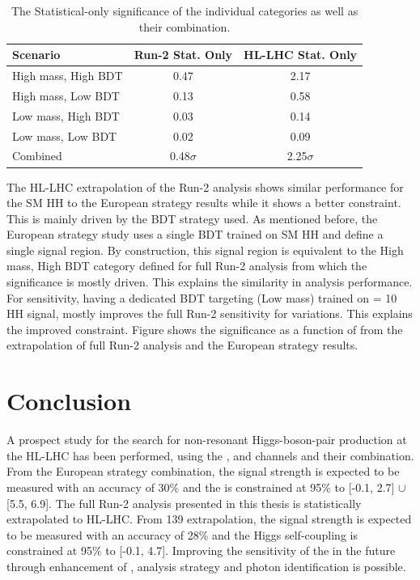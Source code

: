 \begin{table}[htbp]
    \centering
    \begin{tabular}{lcc}
    \hline\hline 
        Scenario & Run-2 Stat. Only & HL-LHC Stat. Only \\
    \hline    
        High mass, High BDT & 0.47 & 2.17 \\
        High mass, Low BDT  & 0.13 & 0.58 \\
        Low mass, High BDT  & 0.03 & 0.14 \\
        Low mass, Low BDT   & 0.02 & 0.09 \\
        \hline
        Combined & 0.48$\sigma$ & 2.25$\sigma$ \\
    \hline\hline 
    \end{tabular}
    \begin{tcolorbox}[colback=black!5!white, colframe=white!75!black]
    \caption{The Statistical-only significance of the individual categories as well as their combination.}
    \label{tab:HL-LHC:Sig}
    \end{tcolorbox}
\end{table}

The HL-LHC extrapolation of the Run-2 analysis shows similar performance for the SM HH to the European strategy results while it shows a better \kl constraint. This is mainly driven by the BDT strategy used. As mentioned before, the European strategy study uses a single BDT trained on SM HH and define a single signal region. By construction, this signal region is equivalent to the High mass, High BDT category defined for full Run-2 analysis from which the significance is mostly driven. This explains the similarity in analysis performance. For \kl sensitivity, having a dedicated BDT targeting (Low mass) trained on \kl = 10 HH signal, mostly improves the full Run-2 sensitivity for \kl variations. This explains the improved \kl constraint. Figure shows the significance as a function of \kl from the extrapolation of full Run-2 analysis and the European strategy results. \\

\section{Conclusion}

A prospect study for the search for non-resonant Higgs-boson-pair production at the HL-LHC has been performed, using the \bbbb, \bbyy and \bbtt channels and their combination. From the European strategy combination, the signal strength is expected to be measured with an accuracy of 30\% and the \kl is constrained at 95\% to [-0.1, 2.7] $\cup$ [5.5, 6.9]. The full Run-2 \HHyybb analysis presented in this thesis is statistically extrapolated to HL-LHC. From 139 \ifb \HHyybb extrapolation, the signal strength is expected to be measured with an accuracy of 28\% and the Higgs self-coupling is constrained at 95\% to [-0.1, 4.7]. Improving the sensitivity of the \HHyybb in the future through enhancement of \mbb, analysis strategy and photon identification is possible.  
